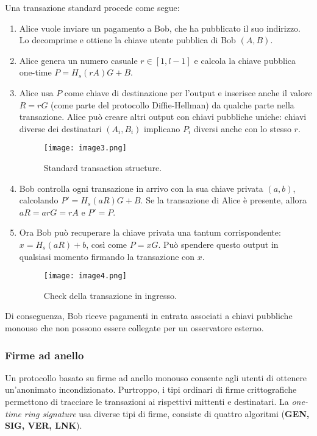 Una transazione standard procede come segue:

\begin{enumerate}
\def\labelenumi{\arabic{enumi}.}
\item
  Alice vuole inviare un pagamento a Bob, che ha pubblicato il suo
  indirizzo. Lo decomprime e ottiene la chiave utente pubblica di Bob
  \emph{$(A, B)$}.
\item
  Alice genera un numero casuale $r \in [1,l-1]$ e calcola la chiave
  pubblica one-time $P=H_s(rA)G+B$.
\item
  Alice usa $P$ come chiave di destinazione per l'output e
  inserisce anche il valore $R=rG$ (come parte del protocollo
  Diffie-Hellman) da qualche parte nella transazione. Alice può creare
  altri output con chiavi pubbliche uniche: chiavi diverse dei
  destinatari \emph{$(A_i,B_i)$} implicano $P_i$ diversi anche con
  lo stesso $r$.

  \begin{figure}[h]
    \centering
    \texttt{[image: image3.png]}
    \caption{Standard transaction structure.}
  \end{figure}
\item
  Bob controlla ogni transazione in arrivo con la sua chiave privata $(a,
  b)$, calcolando $P'=H_s(aR)G+B$. Se la transazione di Alice è presente,
  allora $aR=arG=rA$ e $P'=P$.
\item
  Ora Bob può recuperare la chiave privata una tantum corrispondente:
  $x=H_s(aR)+b$, così come $P=xG$. Può spendere questo output in qualsiasi
  momento firmando la transazione con $x$.

  \begin{figure}[h]
    \centering
    \texttt{[image: image4.png]}
    \caption{Check della transazione in ingresso.}
  \end{figure}
\end{enumerate}

Di conseguenza, Bob riceve pagamenti in entrata associati a chiavi
pubbliche monouso che non possono essere collegate per un osservatore
esterno.

\subsubsection{Firme ad anello}\label{firme-ad-anello}
Un protocollo basato su firme ad anello monouso consente agli utenti di
ottenere un'anonimato incondizionato. Purtroppo, i tipi
ordinari di firme crittografiche permettono di tracciare le transazioni
ai rispettivi mittenti e destinatari. La \emph{one-time ring signature}
usa diverse tipi di firme, consiste di quattro algoritmi (\textbf{GEN,
SIG, VER, LNK}).


